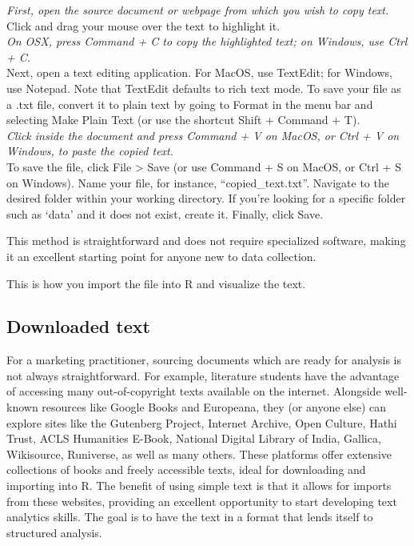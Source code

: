 \emph{First, open the source document or webpage from which you wish to
copy text.\\
}Click and drag your mouse over the text to highlight it.\\
\emph{On OSX, press Command + C to copy the highlighted text; on
Windows, use Ctrl + C.\\
}Next, open a text editing application. For MacOS, use TextEdit; for
Windows, use Notepad. Note that TextEdit defaults to rich text mode. To
save your file as a .txt file, convert it to plain text by going to
Format in the menu bar and selecting Make Plain Text (or use the
shortcut Shift + Command + T).\\
\emph{Click inside the document and press Command + V on MacOS, or Ctrl + V
on Windows, to paste the copied text.\\
}To save the file, click File \textgreater{} Save (or use Command + S on
MacOS, or Ctrl + S on Windows). Name your file, for instance,
``copied\_text.txt''. Navigate to the desired folder within your working
directory. If you're looking for a specific folder such as `data' and it
does not exist, create it. Finally, click Save.

This method is straightforward and does not require specialized
software, making it an excellent starting point for anyone new to data
collection.

This is how you import the file into R and visualize the text.

\begin{Shaded}
\begin{Highlighting}[]
\OtherTok{\textless{}{-}} \NormalTok{(}\NormalTok{)}

\end{Highlighting}
\end{Shaded}

\subsection{Downloaded text}\label{downloaded-text}

For a marketing practitioner, sourcing documents which are ready for analysis is
not always straightforward. For example, literature students have the
advantage of accessing many out-of-copyright texts available on the
internet. Alongside well-known resources like Google Books and
Europeana, they (or anyone else) can explore sites like the Gutenberg Project,
Internet Archive, Open Culture, Hathi Trust, ACLS Humanities E-Book,
National Digital Library of India, Gallica, Wikisource, Runiverse, as well as
many others. These platforms offer extensive collections of books and
freely accessible texts, ideal for downloading and importing into R. The
benefit of using simple text is that it allows for imports from these
websites, providing an excellent opportunity to start developing text
analytics skills. The goal is to have the text in a format that lends itself
to structured analysis.

